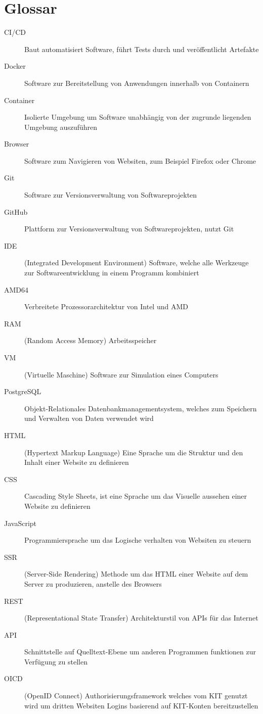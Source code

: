 
\chapter{Glossar}

\begin{description}
\item[CI/CD] Baut automatisiert Software, führt Tests durch und veröffentlicht Artefakte
\item[Docker] Software zur Bereitstellung von Anwendungen innerhalb von Containern
\item[Container] Isolierte Umgebung um Software unabhängig von der zugrunde liegenden Umgebung auszuführen
\item[Browser] Software zum Navigieren von Websiten, zum Beispiel Firefox oder Chrome
\item[Git] Software zur Versionsverwaltung von Softwareprojekten
\item[GitHub] Plattform zur Versionsverwaltung von Softwareprojekten, nutzt Git
\item[IDE] (Integrated Development Environment) Software, welche alle Werkzeuge zur Softwareentwicklung in einem Programm kombiniert
\item[AMD64] Verbreitete Prozessorarchitektur von Intel und AMD
\item[RAM] (Random Access Memory) Arbeitsspeicher
\item[VM] (Virtuelle Maschine) Software zur Simulation eines Computers
\item[PostgreSQL] Objekt-Relationales Datenbankmanagementsystem, welches zum Speichern und Verwalten von Daten verwendet wird
\item[HTML] (Hypertext Markup Language) Eine Sprache um die Struktur und den Inhalt einer Website zu definieren
\item[CSS] Cascading Style Sheets, ist eine Sprache um das Visuelle aussehen einer Website zu definieren
\item[JavaScript] Programmiersprache um das Logische verhalten von Websiten zu steuern
\item[SSR] (Server-Side Rendering) Methode um das HTML einer Website auf dem Server zu produzieren, anstelle des Browsers
\item[REST] (Representational State Transfer) Architekturstil von APIs für das Internet
\item[API] Schnittstelle auf Quelltext-Ebene um anderen Programmen funktionen zur Verfügung zu stellen
\item[OICD] (OpenID Connect) Authorisierungsframework welches vom KIT genutzt wird um dritten Websiten Logins basierend auf KIT-Konten bereitzustellen
\end{description}